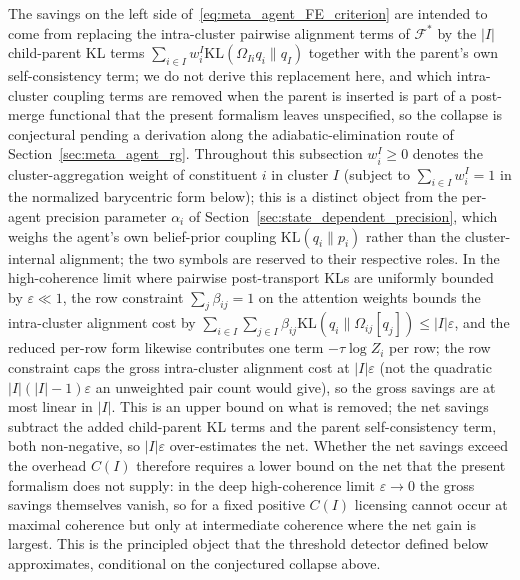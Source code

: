 \documentclass[11pt]{article}
\begin{document}
The savings on the left side of~\eqref{eq:meta_agent_FE_criterion} are intended to come from replacing the intra-cluster pairwise alignment terms of $\mathcal{F}^*$ by the $|I|$ child-parent KL terms $\sum_{i \in I} w_i^I \mathrm{KL}(\Omega_{Ii}q_i \| q_I)$ together with the parent's own self-consistency term; we do not derive this replacement here, and which intra-cluster coupling terms are removed when the parent is inserted is part of a post-merge functional that the present formalism leaves unspecified, so the collapse is conjectural pending a derivation along the adiabatic-elimination route of Section~\ref{sec:meta_agent_rg}. Throughout this subsection $w_i^I \ge 0$ denotes the cluster-aggregation weight of constituent $i$ in cluster $I$ (subject to $\sum_{i \in I} w_i^I = 1$ in the normalized barycentric form below); this is a distinct object from the per-agent precision parameter $\alpha_i$ of Section~\ref{sec:state_dependent_precision}, which weighs the agent's own belief-prior coupling $\mathrm{KL}(q_i \| p_i)$ rather than the cluster-internal alignment; the two symbols are reserved to their respective roles. In the high-coherence limit where pairwise post-transport KLs are uniformly bounded by $\varepsilon \ll 1$, the row constraint $\sum_j \beta_{ij} = 1$ on the attention weights bounds the intra-cluster alignment cost by $\sum_{i \in I}\sum_{j \in I} \beta_{ij} \mathrm{KL}(q_i \| \Omega_{ij}[q_j]) \le |I|\varepsilon$, and the reduced per-row form likewise contributes one term $-\tau \log Z_i$ per row; the row constraint caps the gross intra-cluster alignment cost at $|I|\varepsilon$ (not the quadratic $|I|(|I|-1)\varepsilon$ an unweighted pair count would give), so the gross savings are at most linear in $|I|$. This is an upper bound on what is removed; the net savings subtract the added child-parent KL terms and the parent self-consistency term, both non-negative, so $|I|\varepsilon$ over-estimates the net. Whether the net savings exceed the overhead $C(I)$ therefore requires a lower bound on the net that the present formalism does not supply: in the deep high-coherence limit $\varepsilon \to 0$ the gross savings themselves vanish, so for a fixed positive $C(I)$ licensing cannot occur at maximal coherence but only at intermediate coherence where the net gain is largest. This is the principled object that the threshold detector defined below approximates, conditional on the conjectured collapse above.
\end{document}

